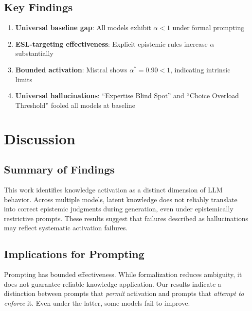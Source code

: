 \documentclass[11pt,a4paper]{article}
\begin{document}
\subsection{Key Findings}

\begin{enumerate}
    \item \textbf{Universal baseline gap}: All models exhibit $\alpha < 1$ under formal prompting
    \item \textbf{ESL-targeting effectiveness}: Explicit epistemic rules increase $\alpha$ substantially
    \item \textbf{Bounded activation}: Mistral shows $\alpha^* = 0.90 < 1$, indicating intrinsic limits
    \item \textbf{Universal hallucinations}: ``Expertise Blind Spot'' and ``Choice Overload Threshold'' fooled all models at baseline
\end{enumerate}






\section{Discussion}

\subsection{Summary of Findings}

This work identifies knowledge activation as a distinct dimension of LLM behavior. Across multiple models, latent knowledge does not reliably translate into correct epistemic judgments during generation, even under epistemically restrictive prompts. These results suggest that failures described as hallucinations may reflect systematic activation failures.

\subsection{Implications for Prompting}

Prompting has bounded effectiveness. While formalization reduces ambiguity, it does not guarantee reliable knowledge application. Our results indicate a distinction between prompts that \emph{permit} activation and prompts that \emph{attempt to enforce} it. Even under the latter, some models fail to improve.
\end{document}
